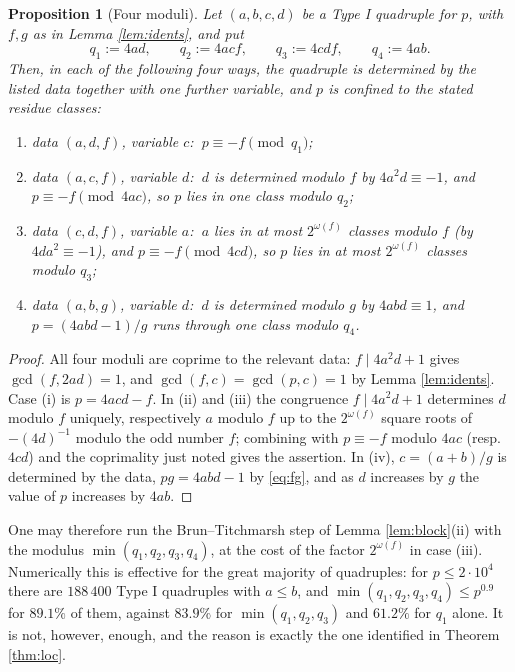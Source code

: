 \documentclass[11pt,reqno]{amsart}
\theoremstyle{plain}
\newtheorem{proposition}[theorem]{Proposition}
\theoremstyle{definition}
\numberwithin{equation}{section}
\begin{document}
\begin{proposition}[Four moduli]\label{prop:four}
Let $(a,b,c,d)$ be a Type I quadruple for $p$, with $f,g$ as in Lemma
\ref{lem:idents}, and put
\[
  q_{1}:=4ad,\qquad q_{2}:=4acf,\qquad q_{3}:=4cdf,\qquad q_{4}:=4ab .
\]
Then, in each of the following four ways, the quadruple is determined by the listed
data together with one further variable, and $p$ is confined to the stated residue
classes:
\begin{enumerate}
\item[(i)] data $(a,d,f)$, variable $c$: $\ p\equiv-f\pmod{q_{1}}$;
\item[(ii)] data $(a,c,f)$, variable $d$: $\ d$ is determined modulo $f$ by
$4a^{2}d\equiv-1$, and $p\equiv-f\pmod{4ac}$, so $p$ lies in one class modulo $q_{2}$;
\item[(iii)] data $(c,d,f)$, variable $a$: $\ a$ lies in at most $2^{\omega(f)}$
classes modulo $f$ (by $4da^{2}\equiv-1$), and $p\equiv-f\pmod{4cd}$, so $p$ lies in at
most $2^{\omega(f)}$ classes modulo $q_{3}$;
\item[(iv)] data $(a,b,g)$, variable $d$: $\ d$ is determined modulo $g$ by
$4abd\equiv1$, and $p=(4abd-1)/g$ runs through one class modulo $q_{4}$.
\end{enumerate}
\end{proposition}

\begin{proof}
All four moduli are coprime to the relevant data: $f\mid 4a^{2}d+1$ gives
$\gcd(f,2ad)=1$, and $\gcd(f,c)=\gcd(p,c)=1$ by Lemma \ref{lem:idents}. Case (i) is
$p=4acd-f$. In (ii) and (iii) the congruence $f\mid4a^{2}d+1$ determines $d$ modulo $f$
uniquely, respectively $a$ modulo $f$ up to the $2^{\omega(f)}$ square roots of
$-(4d)^{-1}$ modulo the odd number $f$; combining with $p\equiv-f$ modulo $4ac$
(resp.\ $4cd$) and the coprimality just noted gives the assertion. In (iv), $c=(a+b)/g$
is determined by the data, $pg=4abd-1$ by \eqref{eq:fg}, and as $d$ increases by $g$
the value of $p$ increases by $4ab$.
\end{proof}

One may therefore run the Brun--Titchmarsh step of Lemma \ref{lem:block}(ii) with the
modulus $\min(q_{1},q_{2},q_{3},q_{4})$, at the cost of the factor $2^{\omega(f)}$ in
case (iii). Numerically this is effective for the great majority of quadruples: for
$p\le2\cdot10^{4}$ there are $188\,400$ Type I quadruples with $a\le b$, and
$\min(q_{1},q_{2},q_{3},q_{4})\le p^{0.9}$ for $89.1\%$ of them, against $83.9\%$ for
$\min(q_{1},q_{2},q_{3})$ and $61.2\%$ for $q_{1}$ alone. It is not, however, enough,
and the reason is exactly the one identified in Theorem \ref{thm:loc}.
\end{document}
